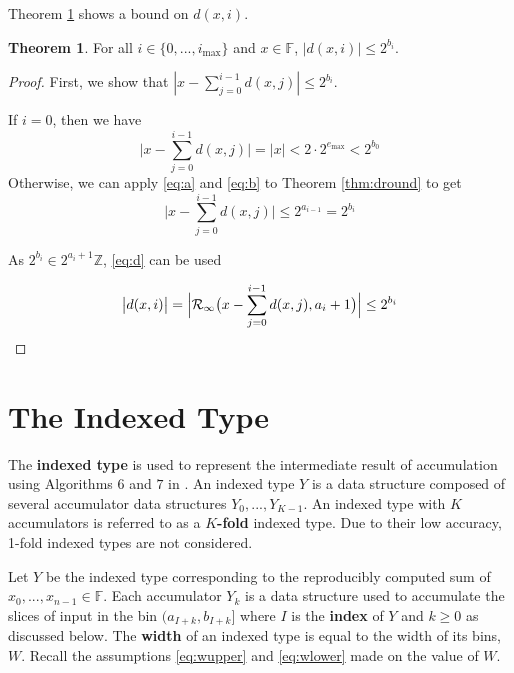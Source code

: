 \documentclass[12pt]{article}
\providecommand{\F}{\ensuremath{\mathbb{F}}}
\providecommand{\Z}{\ensuremath{\mathbb{Z}}}
\providecommand{\max}{\ensuremath{\text{max}}}
\providecommand{\roundtonearestinfty}{\ensuremath{\mathcal{R}_\text{$\infty$}}}
\theoremstyle{definition}
\newtheorem{thm}{Theorem}[section]
\numberwithin{equation}{section}
\numberwithin{figure}{section}
\begin{document}
    Theorem \ref{thm:dbound} shows a bound on $d(x, i)$.

    \begin{samepage}
    \begin{thm}
      For all $i \in \{0, ..., i_{\max}\}$ and $x \in \F$, $|d(x, i)| \leq 2^{b_i}$.
      \label{thm:dbound}
    \end{thm}
    \end{samepage}

    \begin{proof}
      First, we show that $|x - \sum\limits_{j=0}^{i - 1}d(x,j)| \leq 2^{b_i}$.

      If $i = 0$, then we have
      \begin{equation*}
        \bigl|x - \sum\limits_{j=0}^{i - 1}d(x,j)\bigr| = |x| < 2 \cdot 2^{e_{\max}} < 2^{b_0}
      \end{equation*}
      Otherwise, we can apply  \eqref{eq:a} and \eqref{eq:b} to Theorem \ref{thm:dround} to get
      \begin{equation*}
        \bigl|x - \sum \limits_{j = 0}^{i - 1}d(x, j)\bigr| \leq 2^{a_{i - 1}} = 2^{b_i}
      \end{equation*}

      As $2^{b_i} \in 2^{a_i + 1}\Z$,  \eqref{eq:d} can be used

      \begin{equation*}
        \bigl|d(x, i)\bigr| = \Bigl|\roundtonearestinfty\bigl(x - \sum\limits_{j=0}^{i - 1}d(x,j), a_i + 1\bigr)\Bigr| \leq 2^{b_i}
      \end{equation*}
    \end{proof}

\section{The Indexed Type}
  \label{sec:indexed}
    The \textbf{indexed type} is used to represent the intermediate result of accumulation using Algorithms 6 and $7$ in \cite{repsum}.
    An indexed type $Y$ is a data structure composed of several accumulator data structures $Y_0, ..., Y_{K - 1}$. An indexed type with $K$ accumulators is referred to as a \textbf{$K$-fold} indexed type. Due to their low accuracy, 1-fold indexed types are not considered.

    Let $Y$ be the indexed type corresponding to the reproducibly computed sum of $x_0, ..., x_{n - 1} \in \F$.
    Each accumulator $Y_k$ is a data structure used to accumulate the slices of input in the bin $(a_{I + k}, b_{I + k}]$ where $I$ is the \textbf{index} of $Y$ and $k \geq 0$ as discussed below. The \textbf{width} of an indexed type is equal to the width of its bins, $W$. Recall the assumptions \eqref{eq:wupper} and \eqref{eq:wlower} made on the value of $W$.
\end{document}
